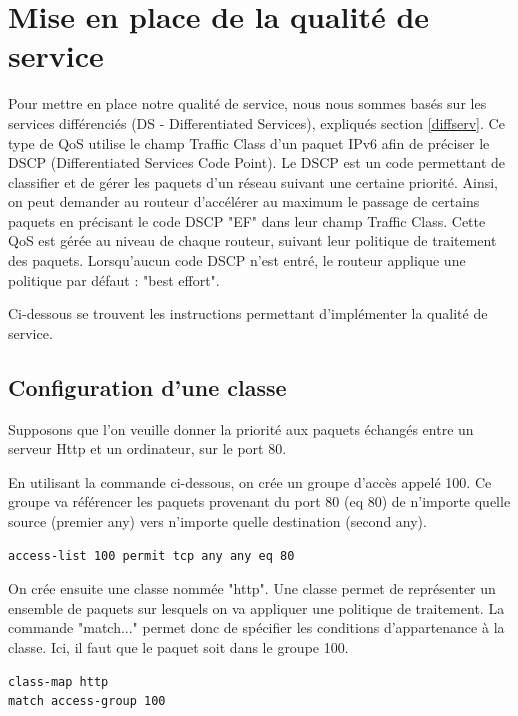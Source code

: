     \section{Mise en place de la qualité de service}

		Pour mettre en place notre qualité de service, nous nous sommes basés sur les services différenciés (DS - Differentiated Services), expliqués section \ref{diffserv}. Ce type de QoS utilise le champ Traffic Class d'un paquet IPv6 afin de préciser le DSCP (Differentiated Services Code Point). Le DSCP est un code permettant de classifier et de gérer les paquets d'un réseau suivant une certaine priorité. Ainsi, on peut demander au routeur d'accélérer au maximum le passage de certains paquets en précisant le code DSCP "EF" dans leur champ Traffic Class. Cette QoS est gérée au niveau de chaque routeur, suivant leur politique de traitement des paquets. Lorsqu'aucun code DSCP n'est entré, le routeur applique une politique par défaut : "best effort".

		Ci-dessous se trouvent les instructions permettant d'implémenter la qualité de service.

		\subsection{Configuration d'une classe}
        
        Supposons que l'on veuille donner la priorité aux paquets échangés entre un serveur Http et un ordinateur, sur le port 80.
        
        En utilisant la commande ci-dessous, on crée un groupe d'accès appelé 100. Ce groupe va référencer les paquets provenant du port 80 (eq 80) de n'importe quelle source (premier any) vers n'importe quelle destination (second any). 
        \begin{lstlisting}[frame=single]
access-list 100 permit tcp any any eq 80
        \end{lstlisting}
        
        On crée ensuite une classe nommée "http". Une classe permet de représenter un ensemble de paquets sur lesquels on va appliquer une politique de traitement. La commande "match..." permet donc de spécifier les conditions d'appartenance à la classe. Ici, il faut que le paquet soit dans le groupe 100. 
        \begin{lstlisting}[frame=single]
class-map http
match access-group 100
        \end{lstlisting}
         
